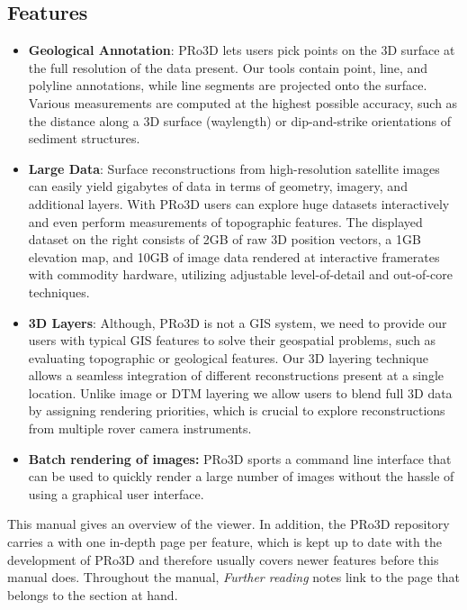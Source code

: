 \subsection{Features}
\label{sec:features}

\begin{itemize}
	\item \textbf{Geological Annotation}: PRo3D lets users pick points on the 3D surface at the full resolution of the data present. Our tools contain point, line, and polyline annotations, while line segments are projected onto the surface. Various measurements are computed at the highest possible accuracy, such as the distance along a 3D surface (waylength) or dip-and-strike orientations of sediment structures. 
	\item \textbf{Large Data}: Surface reconstructions from high-resolution satellite images can easily yield gigabytes of data in terms of geometry, imagery, and additional layers. With PRo3D users can explore huge datasets interactively and even perform measurements of topographic features. The displayed dataset on the right consists of 2GB of raw 3D position vectors, a 1GB elevation map, and 10GB of image data rendered at interactive framerates with commodity hardware, utilizing adjustable level-of-detail and out-of-core techniques. 
	\item \textbf{3D Layers}: Although, PRo3D is not a GIS system, we need to provide our users with typical GIS features to solve their geospatial problems, such as evaluating topographic or geological features. Our 3D layering technique allows a seamless integration of different reconstructions present at a single location. Unlike image or DTM layering we allow users to blend full 3D data by assigning rendering priorities, which is crucial to explore reconstructions from multiple rover camera instruments. 
	\item \textbf{Batch rendering of images:} PRo3D sports a command line interface that can be used to quickly render a large number of images without the hassle of using a graphical user interface.
\end{itemize}

This manual gives an overview of the viewer. In addition, the PRo3D repository carries a
 with one in-depth page per feature, which is kept up to
date with the development of PRo3D and therefore usually covers newer features before this
manual does. Throughout the manual, \textit{Further reading} notes link to the page that
belongs to the section at hand.

